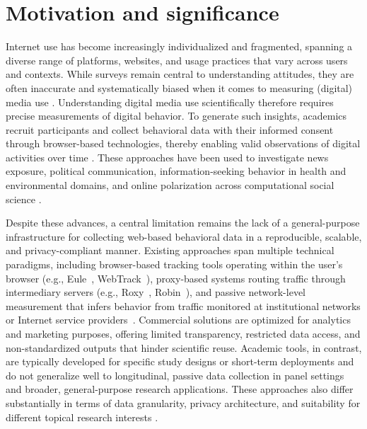 \documentclass[preprint,12pt,a4paper]{elsarticle}
\begin{document}
  \section{Motivation and significance}

Internet use has become increasingly individualized and fragmented, spanning a diverse range of platforms, websites, and usage practices that vary across users and contexts. While surveys remain central to understanding attitudes, they are often inaccurate and systematically biased when it comes to measuring (digital) media use \cite{parry2021systematic, scharkow2016accuracy}. Understanding digital media use scientifically therefore requires precise measurements of digital behavior. To generate such insights, academics recruit participants and collect behavioral data with their informed consent through browser-based technologies, thereby enabling valid observations of digital activities over time \cite{stier2020integrating, wagner2025digitalbehavioral}. These approaches have been used to investigate news exposure, political communication, information-seeking behavior in health and environmental domains, and online polarization across computational social science \cite[e.g.,][]{mangold2025webtracking, Christner2022}.

Despite these advances, a central limitation remains the lack of a general-purpose infrastructure for collecting web-based behavioral data in a reproducible, scalable, and privacy-compliant manner. Existing approaches span multiple technical paradigms, including browser-based tracking tools operating within the user's browser (e.g., Eule~\cite{haim2019computational}, WebTrack~\cite{adam2025webtracking}), proxy-based systems routing traffic through intermediary servers (e.g., Roxy~\cite{menchen2012roxy}, Robin~\cite{bodo2017algorithmic, moller2019explaining}), and passive network-level measurement that infers behavior from traffic monitored at institutional networks or Internet service providers~\cite{holz2020cryptomining}. Commercial solutions are optimized for analytics and marketing purposes, offering limited transparency, restricted data access, and non-standardized outputs that hinder scientific reuse. Academic tools, in contrast, are typically developed for specific study designs or short-term deployments and do not generalize well to longitudinal, passive data collection in panel settings and broader, general-purpose research applications. These approaches also differ substantially in terms of data granularity, privacy architecture, and suitability for different topical research interests \cite{Christner2022, mangold2023infrastrukturen}.
\end{document}
